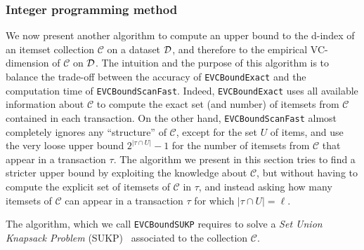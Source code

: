 
\subsubsection{Integer programming method}
We now present another algorithm to compute an upper bound to the d-index of an
itemset collection $\mathcal{C}$ on a dataset ${\cal D}$, and therefore to the
empirical VC-dimension of $\mathcal{C}$ on ${\cal D}$. The intuition and the purpose
of this algorithm is to balance the trade-off between the accuracy of
\texttt{EVCBoundExact} and the computation time of \texttt{EVCBoundScanFast}.
Indeed, \texttt{EVCBoundExact} uses all available information about
$\mathcal{C}$ to compute the exact set (and number) of itemsets from
$\mathcal{C}$ contained in each transaction. On the other hand,
\texttt{EVCBoundScanFast} almost completely ignores any ``structure'' of
$\mathcal{C}$, except for the set $U$ of items, and use the very loose upper bound
$2^{|\tau\cap U|}-1$ for the number of itemsets from $\mathcal{C}$ that appear
in a transaction $\tau$. The algorithm we present in this section tries to find
a stricter upper bound by exploiting the knowledge about $\mathcal{C}$, but
without having to compute the explicit set of itemsets of $\mathcal{C}$ in
$\tau$, and instead asking how many itemsets of $\mathcal{C}$ can appear in a
transaction $\tau$ for which $|\tau\cap U|=\ell$.

The algorithm, which we call \texttt{EVCBoundSUKP} requires to solve a \emph{Set
Union Knapsack Problem} (SUKP)~\citep{GoldschmidtNY94} associated to the
collection $\mathcal{C}$.

